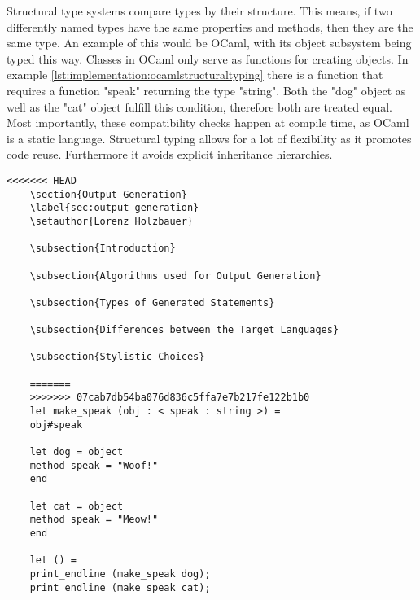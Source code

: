 Structural type systems compare types by their structure. This means, if two differently named types have the same properties and methods, then they are the same type. An example of this would be OCaml, with its object subsystem being typed this way. Classes in OCaml only serve as functions for creating objects. In example \ref{lst:implementation:ocamlstructuraltyping} there is a function that requires a function "speak" returning the type "string". Both the "dog" object as well as the "cat" object fulfill this condition, therefore both are treated equal. Most importantly, these compatibility checks happen at compile time, as OCaml is a static language. Structural typing allows for a lot of flexibility as it promotes code reuse. Furthermore it avoids explicit inheritance hierarchies.

\begin{lstlisting}[language=caml,caption=Example of structural typing in Ocaml,label=lst:implementation:ocamlstructuraltyping]<<<<<<< HEAD
	\section{Output Generation}
	\label{sec:output-generation}
	\setauthor{Lorenz Holzbauer}
	
	\subsection{Introduction}
	
	\subsection{Algorithms used for Output Generation}
	
	\subsection{Types of Generated Statements}
	
	\subsection{Differences between the Target Languages}
	
	\subsection{Stylistic Choices}
	
	=======
	>>>>>>> 07cab7db54ba076d836c5ffa7e7b217fe122b1b0
	let make_speak (obj : < speak : string >) =
	obj#speak

	let dog = object
	method speak = "Woof!"
	end

	let cat = object
	method speak = "Meow!"
	end

	let () =
	print_endline (make_speak dog);
	print_endline (make_speak cat);
\end{lstlisting}

